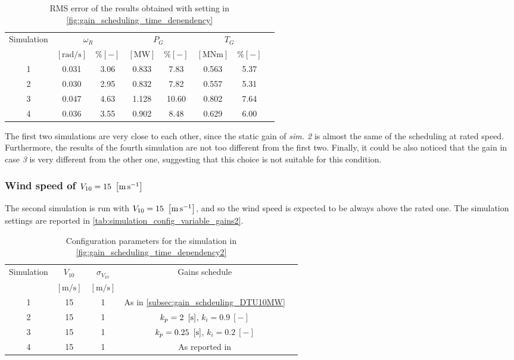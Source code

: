 \begin{table}[htb]
  \caption{RMS error of the results obtained with setting in \autoref{fig:gain_scheduling_time_dependency}}
  \centering
  \begin{tabular}{cccccccc}
    \toprule
      Simulation & \multicolumn{2}{c}{$\omega_R$} & \multicolumn{2}{c}{$P_G$} & \multicolumn{2}{c}{$T_G$} \\ 
       & $\left[\si{\radian\per\second}\right]$ & $ \% \left[-\right]$ & $\left[\si{\mega\watt}\right]$ & $ \% \left[-\right]$ & $\left[\si{\mega\newton\meter} \right]$ & $ \% \left[-\right]$ \\ \midrule       
       1 & 0.031 & 3.06 & 0.833 & 7.83  & 0.563 & 5.37\\
       2 & 0.030 & 2.95 & 0.832 & 7.82  & 0.557 & 5.31\\
       3 & 0.047 & 4.63 & 1.128 & 10.60 & 0.802 & 7.64\\
       4 & 0.036 & 3.55 & 0.902 & 8.48  & 0.629 & 6.00\\
     \bottomrule
  \end{tabular}
  \label{tab:res_variable_gains}
\end{table}

The first two simulations are very close to each other, since the static gain of \textit{sim. 2} is almost the same of the scheduling at rated speed. Furthermore, the results of the fourth simulation are not too different from the first two. Finally, it could be also noticed that the gain in case \textit{3} is very different from the other one, suggesting that this choice is not suitable for this condition. 

\subsubsection{Wind speed of $V_{10}=15 \ \left[\si{\meter\per\second}\right]$}
The second simulation is run with $V_{10}=15 \ \left[\si{\meter\per\second}\right]$, and so the wind speed is expected to be always above the rated one. The simulation settings are reported in \autoref{tab:simulation_config_variable_gains2}.
\begin{table}[htb]
  \caption{Configuration parameters for the simulation in \autoref{fig:gain_scheduling_time_dependency2}}
  \centering
  \begin{tabular}{ccccc}
  \toprule
    Simulation & $V_{10}$  & $\sigma_{V_{10}}$ & Gains schedule \\ 
     & $\left[\si{\meter\per\second}\right]$ & $\left[\si{\meter\per\second}\right]$ & \\ \midrule       
     1 & 15 & 1 & As in \autoref{subsec:gain_schdeuling_DTU10MW}  \\
     2 & 15 & 1 & $k_p = 2 \ \mesunt{\second}$, $k_i=0.9 \ [-]$ \\
     3 & 15 & 1 & $k_p = 0.25 \ \mesunt{\second}$, $k_i=0.2 \ [-]$  \\
     4 & 15 & 1 & As reported in \cite{Olimpo_Anaya‐Lara}  \\
     \bottomrule
  \end{tabular}
  \label{tab:simulation_config_variable_gains2}
\end{table}

